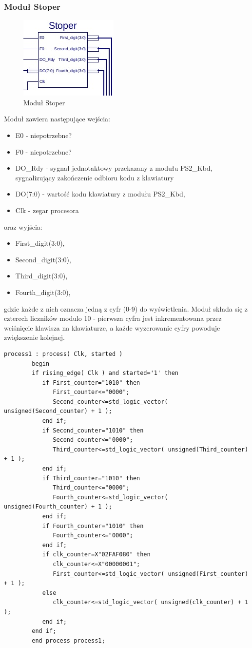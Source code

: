 \documentclass[]{article}
\begin{document}
	\subsubsection{Moduł Stoper}
	\begin{figure}[H]
		\includegraphics[width=.5\linewidth]{img/stoper.jpg}
		\centering
		\caption{Moduł Stoper}
		\label{fig:stoper}
	\end{figure}
	Moduł zawiera następujące wejścia:
	\begin{itemize}
		\item E0 - niepotrzebne?
		\item F0 - niepotrzebne?
		\item DO\_Rdy - sygnał jednotaktowy przekazany z modułu PS2\_Kbd, sygnalizujący zakończenie odbioru kodu z klawiatury
		\item DO(7:0) - wartość kodu klawiatury z modułu PS2\_Kbd,
		\item Clk - zegar procesora
	\end{itemize}
	oraz wyjścia:
	\begin{itemize}
		\item First\_digit(3:0),
		\item Second\_digit(3:0),
		\item Third\_digit(3:0),
		\item Fourth\_digit(3:0),
	\end{itemize}
	gdzie każde z nich oznacza jedną z cyfr (0-9) do wyświetlenia.
	Moduł składa się z czterech liczników modulo 10 - pierwsza cyfra jest inkrementowana przez wciśnięcie klawisza na klawiaturze, a każde wyzerowanie cyfry powoduje zwiększenie kolejnej.
	\noindent\begin{lstlisting}[style=vhdl, autogobble=true, label={lst:stoper}, caption={Proces licznika w module stoper}, captionpos=b]
		process1 : process( Clk, started )
		begin
		if rising_edge( Clk ) and started='1' then
		   if First_counter="1010" then
			  First_counter<="0000";
			  Second_counter<=std_logic_vector( unsigned(Second_counter) + 1 );
		   end if;
		   if Second_counter="1010" then
			  Second_counter<="0000";
			  Third_counter<=std_logic_vector( unsigned(Third_counter) + 1 );
		   end if;
		   if Third_counter="1010" then
			  Third_counter<="0000";
			  Fourth_counter<=std_logic_vector( unsigned(Fourth_counter) + 1 );
		   end if;
		   if Fourth_counter="1010" then
			  Fourth_counter<="0000";
		   end if;
		   if clk_counter=X"02FAF080" then 
			  clk_counter<=X"00000001";
			  First_counter<=std_logic_vector( unsigned(First_counter) + 1 );
		   else
			  clk_counter<=std_logic_vector( unsigned(clk_counter) + 1 );
		   end if;
		end if;
		end process process1;
	\end{lstlisting}
\end{document}
